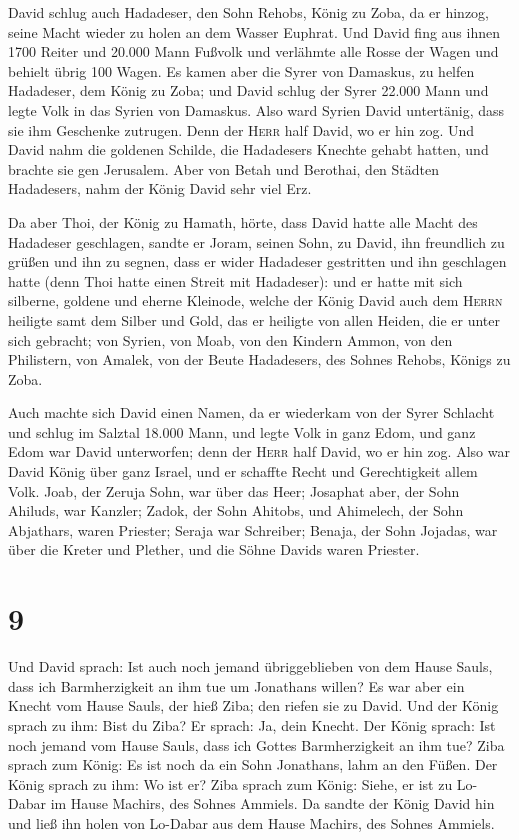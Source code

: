  David schlug auch Hadadeser, den Sohn Rehobs, König zu
Zoba, da er hinzog, seine Macht wieder zu holen an dem Wasser Euphrat.
 Und David fing aus ihnen 1700 Reiter und 20.000 Mann
Fußvolk und verlähmte alle Rosse der Wagen und behielt übrig 100 Wagen.
 Es kamen aber die Syrer von Damaskus, zu helfen
Hadadeser, dem König zu Zoba; und David schlug der Syrer 22.000 Mann
 und legte Volk in das Syrien von Damaskus. Also ward
Syrien David untertänig, dass sie ihm Geschenke zutrugen. Denn der
\textsc{Herr} half David, wo er hin zog.  Und David nahm
die goldenen Schilde, die Hadadesers Knechte gehabt hatten, und brachte
sie gen Jerusalem.  Aber von Betah und Berothai, den
Städten Hadadesers, nahm der König David sehr viel Erz.

 Da aber Thoi, der König zu Hamath, hörte, dass David
hatte alle Macht des Hadadeser geschlagen,  sandte er
Joram, seinen Sohn, zu David, ihn freundlich zu grüßen und ihn zu
segnen, dass er wider Hadadeser gestritten und ihn geschlagen hatte
(denn Thoi hatte einen Streit mit Hadadeser): und er hatte mit sich
silberne, goldene und eherne Kleinode,  welche der König
David auch dem \textsc{Herrn} heiligte samt dem Silber und Gold, das er
heiligte von allen Heiden, die er unter sich gebracht; 
von Syrien, von Moab, von den Kindern Ammon, von den Philistern, von
Amalek, von der Beute Hadadesers, des Sohnes Rehobs, Königs zu Zoba.

 Auch machte sich David einen Namen, da er wiederkam von
der Syrer Schlacht und schlug im Salztal 18.000 Mann, 
und legte Volk in ganz Edom, und ganz Edom war David unterworfen; denn
der \textsc{Herr} half David, wo er hin zog.  Also war
David König über ganz Israel, und er schaffte Recht und Gerechtigkeit
allem Volk.  Joab, der Zeruja Sohn, war über das Heer;
Josaphat aber, der Sohn Ahiluds, war Kanzler;  Zadok, der
Sohn Ahitobs, und Ahimelech, der Sohn Abjathars, waren Priester; Seraja
war Schreiber;  Benaja, der Sohn Jojadas, war über die
Kreter und Plether, und die Söhne Davids waren Priester.

\hypertarget{section-8}{%
\section{9}\label{section-8}}

 Und David sprach: Ist auch noch jemand übriggeblieben von
dem Hause Sauls, dass ich Barmherzigkeit an ihm tue um Jonathans willen?
 Es war aber ein Knecht vom Hause Sauls, der hieß Ziba;
den riefen sie zu David. Und der König sprach zu ihm: Bist du Ziba? Er
sprach: Ja, dein Knecht.  Der König sprach: Ist noch
jemand vom Hause Sauls, dass ich Gottes Barmherzigkeit an ihm tue? Ziba
sprach zum König: Es ist noch da ein Sohn Jonathans, lahm an den Füßen.
 Der König sprach zu ihm: Wo ist er? Ziba sprach zum
König: Siehe, er ist zu Lo-Dabar im Hause Machirs, des Sohnes Ammiels.
 Da sandte der König David hin und ließ ihn holen von
Lo-Dabar aus dem Hause Machirs, des Sohnes Ammiels.

